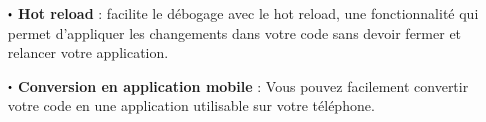 \begin{itemize}
  \item[$\sbullet$] \textbf{Hot reload} : \flutter{} facilite le débogage avec le hot reload, une fonctionnalité qui permet d'appliquer les changements dans votre code sans devoir fermer et relancer votre application.\\

  \item[$\sbullet$] \textbf{Conversion en application mobile} : Vous pouvez facilement convertir votre code en une application utilisable sur votre téléphone.\\

\end{itemize}

